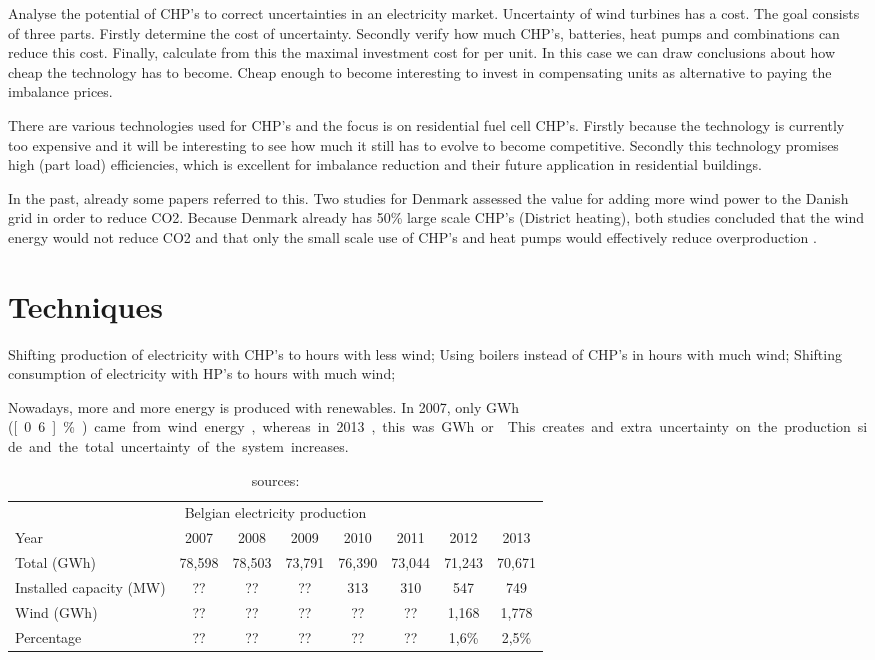Analyse the potential of CHP's to correct uncertainties in an electricity market. Uncertainty of wind turbines has a cost. The goal consists of three parts. Firstly determine the cost of uncertainty. Secondly verify how much CHP's, batteries, heat pumps and combinations can reduce this cost. Finally, calculate from this the maximal investment cost for per unit. In this case we can draw conclusions about how cheap the technology has to become. Cheap enough to become interesting to invest in compensating units as alternative to paying the imbalance prices.

There are various technologies used for CHP's and the focus is on residential fuel cell CHP's. Firstly because the technology is currently too expensive and it will be interesting to see how much it still has to evolve to become competitive. Secondly this technology promises high (part load) efficiencies, which is excellent for imbalance reduction and their future application in residential buildings.

In the past, already some papers referred to this. Two studies for Denmark assessed the value for adding more wind power to the Danish grid in order to reduce CO2. Because Denmark already has 50\% large scale CHP's (District heating), both studies concluded that the wind energy would not reduce CO2 and that only the small scale use of CHP's and heat pumps would effectively reduce overproduction \cite{Lund2005,Lund2003}.

\section{Techniques}
Shifting production of electricity with CHP's to hours with less wind; Using boilers instead of CHP's in hours with much wind; Shifting consumption of electricity with HP's to hours with much wind;


Nowadays, more and more energy is produced with renewables. In 2007, only \unit[491]{GWh} (\unit[0.6]{\%}) came from wind energy, whereas in 2013, this was \unit[1,777]{GWh} or \cite{EliaGrid}. This creates and extra uncertainty on the production side and the total uncertainty of the system increases.

\begin{table}
\begin{tabular}{ l c c c c c c c }
  \multicolumn{8}{c}{Belgian electricity production} \\
  Year               & 2007   & 2008   & 2009   & 2010   & 2011   & 2012   & 2013   \\
  Total (\unit{GWh}) & 78,598 & 78,503 & 73,791 & 76,390 & 73,044 & 71,243 & 70,671 \\
  Installed capacity (\unit{MW})& ?? & ?? & ??  & 313    & 310    & 547    & 749    \\ 
  Wind (\unit{GWh})  & ??     & ??     & ??     & ??     & ??     & 1,168  & 1,778  \\
  Percentage         & ??     & ??     & ??     & ??     & ??     & 1,6\%  & 2,5\%  \\
\end{tabular}
\caption{sources: \cite{EliaO2010,EliaO2011,EliaO2012,EliaGrid}}
\end{table}